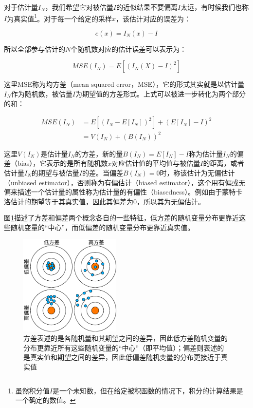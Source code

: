 对于估计量$I_N$，我们希望它对被估量$I$的近似结果不要偏离$I$太远，有时候我们也称$I$为真实值\footnote{虽然积分值$I$是一个未知数，但在给定被积函数的情况下，积分的计算结果是一个确定的数值。}。对于每一个给定的采样$x$，该估计对应的误差为：

\begin{equation}
	e(x)=I_N(x)-I
\end{equation}

\noindent 所以全部参与估计的$N$个随机数对应的估计误差可以表示为：

\begin{equation}
	MSE(I_N)=E[(I_N(X)-I)^2]
\end{equation}


\noindent 这里MSE称为均方差（mean squared error，MSE），它的形式其实就是以估计量$I_N$作为随机数，被估量$I$为期望值的方差形式。上式可以被进一步转化为两个部分的和：

\begin{equation}
\begin{aligned}
	MSE(I_N)&=E[(I_N-E[I_N])^2]+(E[I_N]-I)^2 \\
	        &=V(I_N)+(B(I_N))^2
\end{aligned}
\end{equation}

\noindent 这里$V(I_N)$是估计量$I_N$的方差，新的量$B(I_N)=E[I_N]-I$称为估计量$I_N$的偏差（bias），它表示的是所有随机数$x$对应估计值的平均值与被估量$I$的距离，或者估计量$I_N$的期望与被估量$I$的差。当偏差$B(I_N)=0$时，称该估计为无偏估计（unbiased estimator），否则称为有偏估计（biased estimator），这个用有偏或无偏来描述一个估计量的属性称为估计量的有偏性（biasedness）。例如由于蒙特卡洛估计的期望等于其真实值，因此其偏差为0，所以其为无偏估计。

图\ref{f:pt-bias-variance}描述了方差和偏差两个概念各自的一些特征，低方差的随机变量分布更靠近这些随机变量的“中心”，而低偏差的随机变量分布更靠近真实值。

\begin{figure}
	\sidecaption
	\includegraphics[width=0.45\textwidth]{figures/pt/bias-variance}
	\caption{方差表述的是各随机量和其期望之间的差异，因此低方差随机变量的分布更靠近所有这些随机变量的“中心”（即平均值）；偏差则表述的是真实值和期望之间的差异，因此低偏差随机变量的分布更接近于真实值}
	\label{f:pt-bias-variance}
\end{figure}

